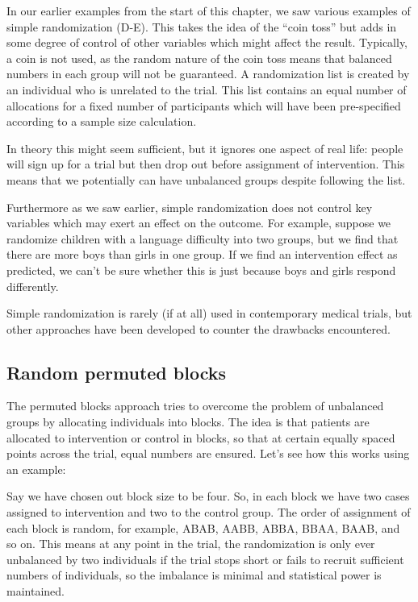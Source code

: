 \documentclass{krantz}
\begin{document}
In our earlier examples from the start of this chapter, we saw various examples of simple randomization (D-E). This takes the idea of the ``coin toss'' but adds in some degree of control of other variables which might affect the result. Typically, a coin is not used, as the random nature of the coin toss means that balanced numbers in each group will not be guaranteed. A randomization list is created by an individual who is unrelated to the trial. This list contains an equal number of allocations for a fixed number of participants which will have been pre-specified according to a sample size calculation.

In theory this might seem sufficient, but it ignores one aspect of real life: people will sign up for a trial but then drop out before assignment of intervention. This means that we potentially can have unbalanced groups despite following the list.

Furthermore as we saw earlier, simple randomization does not control key variables which may exert an effect on the outcome. For example, suppose we randomize children with a language difficulty into two groups, but we find that there are more boys than girls in one group. If we find an intervention effect as predicted, we can't be sure whether this is just because boys and girls respond differently.

Simple randomization is rarely (if at all) used in contemporary medical trials, but other approaches have been developed to counter the drawbacks encountered.

\hypertarget{random-permuted-blocks}{%
\subsection{Random permuted blocks}\label{random-permuted-blocks}}

The permuted blocks approach tries to overcome the problem of unbalanced groups by allocating individuals into blocks. The idea is that patients are allocated to intervention or control in blocks, so that at certain equally spaced points across the trial, equal numbers are ensured. Let's see how this works using an example:

Say we have chosen out block size to be four. So, in each block we have two cases assigned to intervention and two to the control group. The order of assignment of each block is random, for example, ABAB, AABB, ABBA, BBAA, BAAB, and so on. This means at any point in the trial, the randomization is only ever unbalanced by two individuals if the trial stops short or fails to recruit sufficient numbers of individuals, so the imbalance is minimal and statistical power is maintained.
\end{document}

